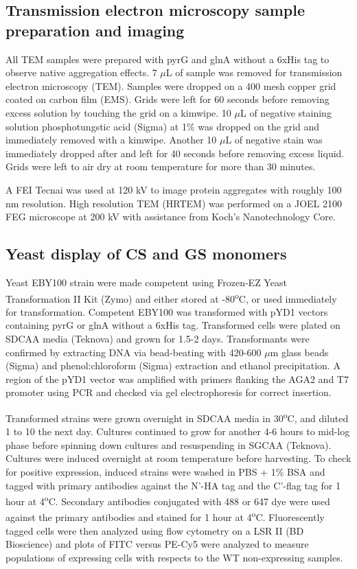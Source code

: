 \documentclass[../main/main]{subfiles}
\begin{document}
\subsection*{Transmission electron microscopy sample preparation and imaging}
All TEM samples were prepared with pyrG and glnA without a 6xHis tag to observe native aggregation effects. 7 $\mu$L of sample was removed for transmission electron microscopy (TEM). Samples were dropped on a 400 mesh copper grid coated on carbon film (EMS). Grids were left for 60 seconds before removing excess solution by touching the grid on a kimwipe. 10 $\mu$L of negative staining solution phosphotungstic acid (Sigma) at 1\% was dropped on the grid and immediately removed with a kimwipe. Another 10 $\mu$L of negative stain was immediately dropped after and left for 40 seconds before removing excess liquid. Grids were left to air dry at room temperature for more than 30 minutes.

A FEI Tecnai was used at 120 kV to image protein aggregates with roughly 100 nm resolution. High resolution TEM (HRTEM) was performed on a JOEL 2100 FEG microscope at 200 kV with assistance from Koch’s Nanotechnology Core.

\subsection*{Yeast display of CS and GS monomers}
Yeast EBY100 strain were made competent using Frozen-EZ Yeast Transformation II Kit (Zymo) and either stored at -80\textsuperscript{o}C, or used immediately for transformation. Competent EBY100 was transformed with pYD1 vectors containing pyrG or glnA without a 6xHis tag. Transformed cells were plated on SDCAA media (Teknova) and grown for 1.5-2 days. Transformants were confirmed by extracting DNA via bead-beating with 420-600 $\mu$m glass beads (Sigma) and phenol:chloroform (Sigma) extraction and ethanol precipitation. A region of the pYD1 vector was amplified with primers flanking the AGA2 and T7 promoter using PCR and checked via gel electrophoresis for correct insertion.

Transformed strains were grown overnight in SDCAA media in 30\textsuperscript{o}C, and diluted 1 to 10 the next day. Cultures continued to grow for another 4-6 hours to mid-log phase before spinning down cultures and resuspending in SGCAA (Teknova). Cultures were induced overnight at room temperature before harvesting. To check for positive expression, induced strains were washed in PBS + 1\% BSA and tagged with primary antibodies against the N'-HA tag and the C'-flag tag for 1 hour at 4\textsuperscript{o}C. Secondary antibodies conjugated with 488 or 647 dye were used against the primary antibodies and stained for 1 hour at 4\textsuperscript{o}C. Fluorescently tagged cells were then analyzed using flow cytometry on a LSR II (BD Bioscience) and plots of FITC versus PE-Cy5 were analyzed to measure populations of expressing cells with respects to the WT non-expressing samples.
\end{document}
